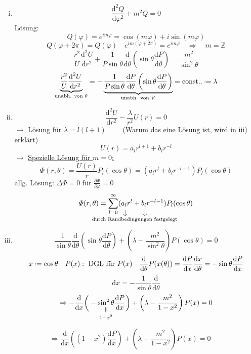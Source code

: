 \documentclass[titlepage,11pt,a4paper,ngerman]{report}
\newcommand*{\defeq}{\mathrel{\vcenter{\baselineskip0.5ex \lineskiplimit0pt \hbox{\scriptsize.}\hbox{\scriptsize.}}}=}
\newcommand{\tx}[1]{\textrm{#1}}
\newcommand{\const}{\tx{const.}}
\newcommand{\ub}[1]{\underbrace{#1}}
\newcommand{\dd}{\tx{d}}
\newcommand{\verteq}{\rotatebox{90}{$\,=$}}
\newcommand{\equalto}[2]{\underset{\scriptstyle\overset{\mkern4mu\verteq}{#2}}{#1}}
\newcommand{\custo}[3]{\underset{\scriptstyle\overset{\mkern4mu\rotatebox{-90}{$\,#1$}}{#3}}{#2}}
\newcommand{\prt}[2]{\frac{\partial #1}{\partial #2}}
\newcommand{\prd}[2]{\frac{\tx{d} #1}{\tx{d} #2}}
\renewcommand{\Phi}{\varPhi}
\newcommand{\summ}[2]{\sum_{#1}^{#2}}
\newcommand{\frbox}[2]{\begin{tcolorbox}[colback=white,colframe=red!75!black,fonttitle=\bfseries,title=#1]#2\end{tcolorbox}}
\begin{document}
\begin{enumerate}[i)]
	\item $$\frac{\textrm{d}^2 Q}{\textrm{d} \varphi^2} + m^2 Q = 0$$ Lösung: $$Q(\varphi) = e^{im\varphi} = \cos(m\varphi) + i\sin(m\varphi)$$
	 	$$Q(\varphi + 2 \pi) = Q(\varphi) \quad e^{im(\varphi + 2\pi)} = e^{im\varphi} \quad \Rightarrow \quad m = \mathbb Z$$
	 	$$\frac{r^2}{U} \frac{\textrm{d}^2 U}{\textrm{d} r^2} + \frac{1}{P\sin\theta} \frac{\textrm{d}}{\textrm{d} \theta}\left( \sin\theta \frac{\textrm{d}P}{\textrm{d}\theta} \right) = \frac{m^2}{\sin^2\theta}$$
	 	$$\ub{\frac{r^2}{U} \frac{\textrm{d}^2 U}{\textrm{d} r^2}}_{\tx{unabh. von } \theta } = - \ub{\frac{1}{P\sin\theta}\frac{\textrm{d} P}{\textrm{d} \theta}\left( \sin\theta \frac{\textrm{d}P}{\textrm{d}\theta} \right)}_{\tx{unabh. von } V} = \const. \defeq \lambda$$
	 \item $$\frac{\textrm{d}^2 U}{\textrm{d} r^2} - \frac{\lambda}{r^2} U(r) = 0$$
	 	$\rightarrow$ Lösung für $\lambda = l(l + 1) \qquad$ (Warum das eine Lösung ist, wird  in iii) erklärt)
	 	$$U(r) = a_l r^{l + 1} + b_l r^{-l}$$
	 	$\rightarrow$ \underline{Spezielle Lösung für $m = 0$:}
	 	$$\Phi(r,\theta) = \frac{U(r)}{r}P_l (\cos\theta) = (a_l r^l + b_l r^{-l - 1}) P_l (\cos\theta)$$
	 	allg. Lösung: $\Delta\Phi = 0$ für $\prt{\Phi}{\varphi} = 0$
	 	$$\Phi(r,\theta) = \summ{l = 0}{\infty} (\custo{\to}{a_l}{\mathclap{\hspace{30pt}\textrm{durch Randbedingungen festgelegt}}} r^l + \custo{\to}{b_l}{} r^{-l - 1}) P_l(\cos\theta)$$
	 \item $$\frac{1}{\sin\theta} \frac{\textrm{d}}{\textrm{d} \theta}\left( \sin\theta \frac{\textrm{d}P}{\textrm{d}\theta}\right) + \left(\lambda - \frac{m^2}{\sin^2\theta}\right)P(\cos\theta) = 0$$
	 	$$x \defeq \cos\theta \quad P(x): \textrm{ DGL für } P(x) \quad \frac{\textrm{d}}{\textrm{d} \theta} P(x(\theta)) = \frac{\textrm{d}P}{\textrm{d}x} \frac{\textrm{d}x}{\textrm{d}\theta} = -\sin \theta \frac{\textrm{d}P}{\textrm{d}x}$$
	 	\begin{equation*}
	 	\dd x = - \frac{1}{\sin\theta} \prd{}{\theta}
	 	\end{equation*}
	 	$$\Rightarrow - \frac{\textrm{d}}{\textrm{d}x} \bigg( - \equalto{\sin^2\theta}{1 - x^2} \frac{\textrm{d}P}{\textrm{d}x} \bigg) + \left(\lambda - \frac{m^2}{1-x^2}\right) P(x) = 0$$
\end{enumerate}
\frbox{Zugeordnete Legendresche DGL}{$$\Rightarrow \frac{\textrm{d}}{\textrm{d}x} \left( (1-x^2) \frac{\textrm{d}P}{\textrm{d}x} \right) + \left( \lambda - \frac{m^2}{1 - x^2} \right) P(x) = 0$$}
\end{document}
